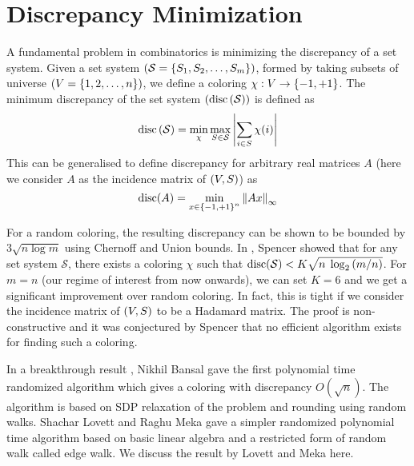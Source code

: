 \section{Discrepancy Minimization}

A fundamental problem in combinatorics is minimizing the discrepancy of a set system.
Given a set system $\left(\mathcal{S} = \left\{S_1,S_2,\hdots,S_m\right\} \right )$, formed by taking subsets of universe $\left(V = \left\{1,2,\hdots,n\right\} \right )$, we define a coloring $\chi: V \to \left\{-1,+1\right\}$.
The minimum discrepancy of the set system $\left(\operatorname{disc}\left(\mathcal{S} \right ) \right )$ is defined as
\[ \operatorname{disc}\left(\mathcal{S} \right ) = \min_{\chi}\max_{S \in \mathcal{S}}{\left\lvert \sum_{i \in S}{\chi(i)} \right\rvert} \]
This can be generalised to define discrepancy for arbitrary real matrices $A$ (here we consider $A$ as the incidence matrix of $\left(V,S \right )$) as
\[ \operatorname{disc}(A) = \min_{x \in \left\{-1,+1\right\}^n} \left\lVert Ax \right\rVert_{\infty}\]

For a random coloring, the resulting discrepancy can be shown to be bounded by $3\sqrt{n\log m}$ using Chernoff and Union bounds.
In \cite{Spencer1985}, Spencer showed that for any set system $\mathcal{S}$, there exists a coloring $\chi$ such that $\operatorname{disc}(\mathcal{S}) < K\sqrt{n\;\log_2{(m/n)}}$.
For $m=n$ (our regime of interest from now onwards), we can set $K=6$ and we get a significant improvement over random coloring.
In fact, this is tight if we consider the incidence matrix of $\left(V,S \right )$ to be a Hadamard matrix. The proof is non-constructive and it was conjectured by Spencer that no efficient algorithm exists for finding such a coloring.

In a breakthrough result \cite{bansal10cadm}, Nikhil Bansal gave the first polynomial time randomized algorithm which gives a coloring with discrepancy $O(\sqrt{n})$.
The algorithm is based on SDP relaxation of the problem and rounding using random walks.
Shachar Lovett and Raghu Meka \cite{12lovettmeka} gave a simpler randomized polynomial time algorithm based on basic linear algebra and a restricted form of random walk called edge walk.
We discuss the result by Lovett and Meka here.


